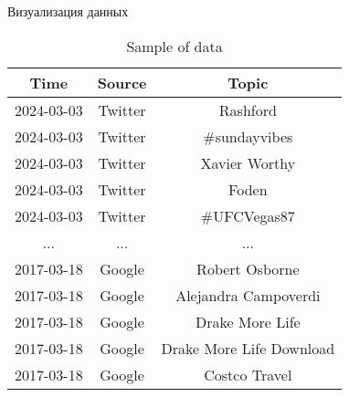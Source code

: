 \documentclass{beamer}
\begin{document}
\begin{frame}{Визуализация данных}
\begin{table}[h]
\centering
\begin{tabular}{|c|c|c|}
\hline
\textbf{Time} & \textbf{Source} & \textbf{Topic}           \\ \hline
2024-03-03    & Twitter         & Rashford                 \\ \hline
2024-03-03    & Twitter         & \#sundayvibes            \\ \hline
2024-03-03    & Twitter         & Xavier Worthy            \\ \hline
2024-03-03    & Twitter         & Foden                    \\ \hline
2024-03-03    & Twitter         & \#UFCVegas87             \\ \hline
...           & ...             & ...                      \\ \hline
2017-03-18    & Google          & Robert Osborne           \\ \hline
2017-03-18    & Google          & Alejandra Campoverdi     \\ \hline
2017-03-18    & Google          & Drake More Life          \\ \hline
2017-03-18    & Google          & Drake More Life Download \\ \hline
2017-03-18    & Google          & Costco Travel            \\ \hline
\end{tabular}
\caption{Sample of data}
\label{tab:timefromtime}
\end{table}


\end{frame}
\end{document}
